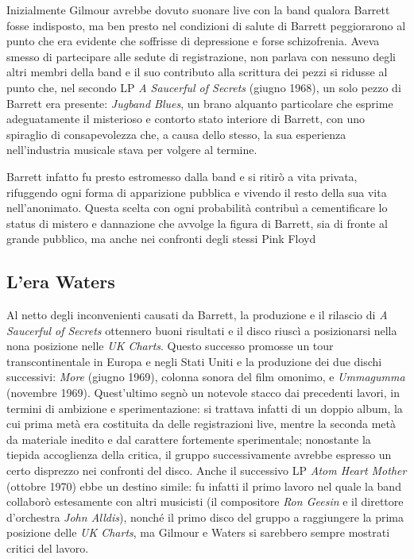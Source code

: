 \documentclass[class=book, crop=false, oneside, 12pt]{standalone}
\begin{document}
    Inizialmente Gilmour avrebbe dovuto suonare live con la band qualora Barrett fosse indisposto, ma ben presto nel condizioni di salute di Barrett peggiorarono al punto che era evidente che soffrisse di depressione e forse schizofrenia. Aveva smesso di partecipare alle sedute di registrazione, non parlava con nessuno degli altri membri della band e il suo contributo alla scrittura dei pezzi si ridusse al punto che, nel secondo LP \emph{A Saucerful of Secrets} (giugno 1968), un solo pezzo di Barrett era presente: \emph{Jugband Blues}, un brano alquanto particolare che esprime adeguatamente il misterioso e contorto stato interiore di Barrett, con uno spiraglio di consapevolezza che, a causa dello stesso, la sua esperienza nell'industria musicale stava per volgere al termine.

    Barrett infatto fu presto estromesso dalla band e si ritirò a vita privata, rifuggendo ogni forma di apparizione pubblica e vivendo il resto della sua vita nell'anonimato. Questa scelta con ogni probabilità contribuì a cementificare lo status di mistero e dannazione che avvolge la figura di Barrett, sia di fronte al grande pubblico, ma anche nei confronti degli stessi Pink Floyd

    \subsection{L'era Waters}
    Al netto degli inconvenienti causati da Barrett, la produzione e il rilascio di \emph{A Saucerful of Secrets} ottennero buoni risultati e il disco riuscì a posizionarsi nella nona posizione nelle \emph{UK Charts}. Questo successo promosse un tour transcontinentale in Europa e negli Stati Uniti e la produzione dei due dischi successivi: \emph{More} (giugno 1969), colonna sonora del film omonimo, e \emph{Ummagumma} (novembre 1969). Quest'ultimo segnò un notevole stacco dai precedenti lavori, in termini di ambizione e sperimentazione: si trattava infatti di un doppio album, la cui prima metà era costituita da delle registrazioni live, mentre la seconda metà da materiale inedito e dal carattere fortemente sperimentale; nonostante la tiepida accoglienza della critica, il gruppo successivamente avrebbe espresso un certo disprezzo nei confronti del disco. Anche il successivo LP  \emph{Atom Heart Mother} (ottobre 1970) ebbe un destino simile: fu infatti il primo lavoro nel quale la band collaborò estesamente con altri musicisti (il compositore \emph{Ron Geesin} e il direttore d'orchestra \emph{John Alldis}), nonché il primo disco del gruppo a raggiungere la prima posizione delle \emph{UK Charts}, ma Gilmour e Waters si sarebbero sempre mostrati critici del lavoro.
\end{document}
